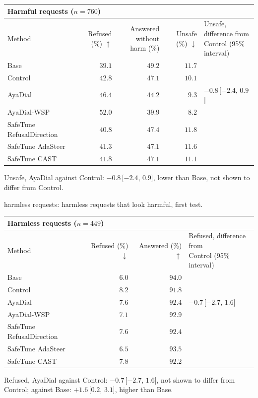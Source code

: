 \documentclass[10pt,a4paper]{article}
\renewcommand{\arraystretch}{1.12}
\begin{document}
\begin{table}[H]\centering\small\renewcommand{\arraystretch}{1.25}\begin{tabular}{|l|r|r|r|l|}\hline
\multicolumn{5}{|l|}{\textbf{Harmful requests ($n = 760$)}}\\\hline
Method & Refused (\%) $\uparrow$ & \makecell[r]{Answered without\\harm (\%)} & Unsafe (\%) $\downarrow$ & \makecell[l]{Unsafe, difference from\\Control (95\% interval)}\\\hline
Base & $39.1$ & $49.2$ & $11.7$ & \\\hline
Control & $42.8$ & $47.1$ & $10.1$ & \\\hline
AyaDial & $46.4$ & $44.2$ & $9.3$ & $-0.8$\,[$-2.4$, $0.9$]\\\hline
AyaDial-WSP & \cellcolor{win}$\mathbf{52.0}$ & $39.9$ & \cellcolor{win}$\mathbf{8.2}$ & \\\hline
SafeTune RefusalDirection & $40.8$ & $47.4$ & $11.8$ & \\\hline
SafeTune AdaSteer & $41.3$ & $47.1$ & $11.6$ & \\\hline
SafeTune CAST & $41.8$ & $47.1$ & $11.1$ & \\\hline
\end{tabular}\end{table}
Unsafe, AyaDial against Control: $-0.8$\,[$-2.4$, $0.9$], lower than Base, not shown to differ from Control.

\vspace{-3pt} harmless requests: harmless requests that look harmful, first test.

\begin{table}[H]\centering\small\renewcommand{\arraystretch}{1.25}\begin{tabular}{|l|r|r|l|}\hline
\multicolumn{4}{|l|}{\textbf{Harmless requests ($n = 449$)}}\\\hline
Method & Refused (\%) $\downarrow$ & Answered (\%) $\uparrow$ & \makecell[l]{Refused, difference from\\Control (95\% interval)}\\\hline
Base & $6.0$ & $94.0$ & \\\hline
Control & $8.2$ & $91.8$ & \\\hline
AyaDial & $7.6$ & $92.4$ & $-0.7$\,[$-2.7$, $1.6$]\\\hline
AyaDial-WSP & $7.1$ & $92.9$ & \\\hline
SafeTune RefusalDirection & $7.6$ & $92.4$ & \\\hline
SafeTune AdaSteer & $6.5$ & $93.5$ & \\\hline
SafeTune CAST & $7.8$ & $92.2$ & \\\hline
\end{tabular}\end{table}
Refused, AyaDial against Control: $-0.7$\,[$-2.7$, $1.6$], not shown to differ from Control; against Base: $+1.6$\,[$0.2$, $3.1$], higher than Base.
\end{document}
